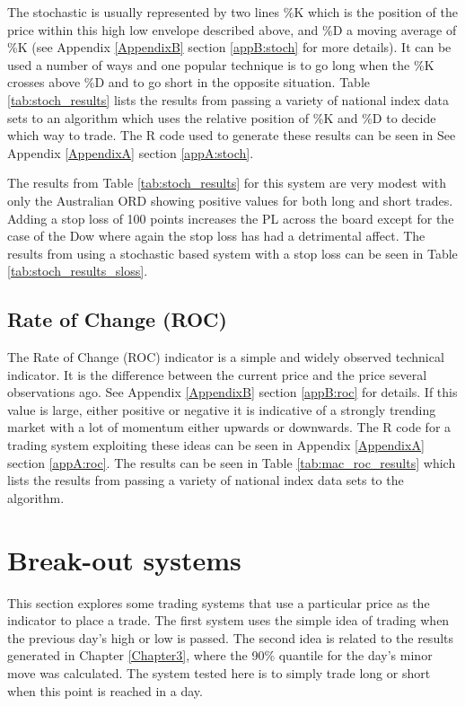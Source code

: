 The stochastic is usually represented by two lines \%K which is the position of the price within this high low envelope described above, and \%D a moving average of \%K (see Appendix \ref{AppendixB} section \ref{appB:stoch} for more details). It can be used a number of ways and one popular technique is to go long when the \%K crosses above \%D and to go short in the opposite situation. Table \ref{tab:stoch_results} lists the results from passing a variety of national index data sets to an algorithm which uses the relative position of \%K and \%D to decide which way to trade. The R code used to generate these results can be seen in See Appendix \ref{AppendixA} section \ref{appA:stoch}.



The results from Table \ref{tab:stoch_results} for this system are very modest with only the Australian ORD showing positive values for both long and short trades. Adding a stop loss of 100 points increases the PL across the board except for the case of the Dow where again the stop loss has had a detrimental affect. The results from using a stochastic based system with a stop loss can be seen in Table \ref{tab:stoch_results_sloss}.


 
\subsection{Rate of Change (ROC)}
The Rate of Change (ROC) indicator is a simple and widely observed technical indicator. It is the difference between the current price and the price several observations ago. See Appendix \ref{AppendixB} section \ref{appB:roc} for details. If this value is large, either positive or negative it is indicative of a strongly trending market with a lot of momentum either upwards or downwards. The R code for a trading system exploiting these ideas can be seen in Appendix \ref{AppendixA} section \ref{appA:roc}. The results can be seen in Table \ref{tab:mac_roc_results} which lists the results from passing a variety of national index data sets to the algorithm.



%

\section{Break-out systems}
\label{sec:bout}
This section explores some trading systems that use a particular price as the indicator to place a trade. The first system uses the simple idea of trading when the previous day's high or low is passed. The second idea is related to the results generated in Chapter \ref{Chapter3}, where the 90\% quantile for the day's minor move was calculated. The system tested here is to simply trade long or short when this point is reached in a day.

